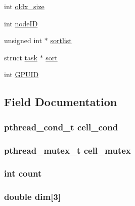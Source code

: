 \begin{DoxyCompactItemize}
\item 
int \hyperlink{structcell_a30be75ac627de0f6fe3baf6abaad344b}{oldx\-\_\-size}
\item 
int \hyperlink{structcell_a2253df22e702f6bc02a8b7d839aec819}{node\-I\-D}
\item 
unsigned int $\ast$ \hyperlink{structcell_a4151bd113572f23f471e24240cad4e65}{sortlist}
\item 
struct \hyperlink{structtask}{task} $\ast$ \hyperlink{structcell_aa5f1733249f610dbecb00b23369c2008}{sort}
\item 
int \hyperlink{structcell_a6ea1b306365231c7a91cdf5f7567a6ac}{G\-P\-U\-I\-D}
\end{DoxyCompactItemize}


\subsection{Field Documentation}
\hypertarget{structcell_a31bb6a241fe11a2497848544f6721733}{
\subsubsection[{cell\-\_\-cond}]{\setlength{\rightskip}{0pt plus 5cm}pthread\-\_\-cond\-\_\-t cell\-\_\-cond}}\label{structcell_a31bb6a241fe11a2497848544f6721733}
\hypertarget{structcell_aa508b7c8849aa057fc846870f7cf2f4d}{
\subsubsection[{cell\-\_\-mutex}]{\setlength{\rightskip}{0pt plus 5cm}pthread\-\_\-mutex\-\_\-t cell\-\_\-mutex}}\label{structcell_aa508b7c8849aa057fc846870f7cf2f4d}
\hypertarget{structcell_ad43c3812e6d13e0518d9f8b8f463ffcf}{
\subsubsection[{count}]{\setlength{\rightskip}{0pt plus 5cm}int count}}\label{structcell_ad43c3812e6d13e0518d9f8b8f463ffcf}
\hypertarget{structcell_ac45d92a78e958d1bdbce22331b752147}{
\subsubsection[{dim}]{\setlength{\rightskip}{0pt plus 5cm}double dim\mbox{[}3\mbox{]}}}\label{structcell_ac45d92a78e958d1bdbce22331b752147}

